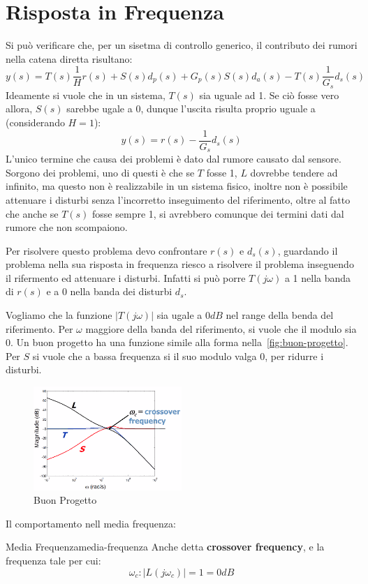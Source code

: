 \documentclass[12pt]{article}
\begin{document}
\newpage
\section{Risposta in Frequenza}
Si pu\`o verificare che, per un sisetma di controllo generico, il contributo dei rumori nella catena diretta risultano:
\[ y(s) = T(s) \frac{1}{H}  r(s) + S(s)d_p(s) + G_p(s)S(s) d_a(s) - T(s) \frac{1}{G_s} d_s(s) \]
Ideamente si vuole che in un sistema, $T(s)$ sia uguale ad 1. Se ci\`o fosse vero allora, $S(s)$ sarebbe ugale a 0, dunque l'uscita risulta proprio uguale a (considerando $H = 1$):
\[ y(s) = r(s) - \frac{1}{G_s} d_s(s)\]
L'unico termine che causa dei problemi \`e dato dal rumore causato dal sensore. Sorgono dei problemi, uno di questi \`e che se $T$ fosse 1, $L$ dovrebbe tendere ad infinito, ma questo non \`e realizzabile in un sistema fisico, inoltre non \`e possibile attenuare i disturbi senza l'incorretto inseguimento del riferimento, oltre al fatto che anche se $T(s)$ fosse sempre 1, si avrebbero comunque dei  termini dati dal rumore che non scompaiono.

Per risolvere questo problema devo confrontare $r(s)$ e $d_s(s)$, guardando il problema nella sua risposta in frequenza riesco a risolvere il problema inseguendo il rifermento ed attenuare i disturbi. Infatti si pu\`o porre $T(j\omega)$ a 1 nella banda di $r(s)$ e a 0 nella banda dei disturbi $d_s$.


Vogliamo che la funzione $|T(j \omega)|$ sia ugale a $0dB$ nel range della benda del riferimento. Per $\omega$ maggiore della banda del riferimento, si vuole che il modulo sia 0. Un buon progetto ha una funzione simile alla forma nella~\autoref{fig:buon-progetto}. Per $S$ si vuole che a bassa frequenza si il suo modulo valga 0, per ridurre i disturbi.
\begin{figure}[H]
    \centering
    \includegraphics[width=0.5\textwidth]{buon-progetto.png}
    \caption{Buon Progetto}
    \label{fig:buon-progetto}
\end{figure}


Il comportamento nell media frequenza:
\begin{definition}{Media Frequenza}{media-frequenza}
    Anche detta \textbf{crossover frequency}, e la frequenza tale per cui:
    \[ \omega_c: |L(j\omega_c)| = 1 = 0dB \]
\end{definition}
\end{document}
